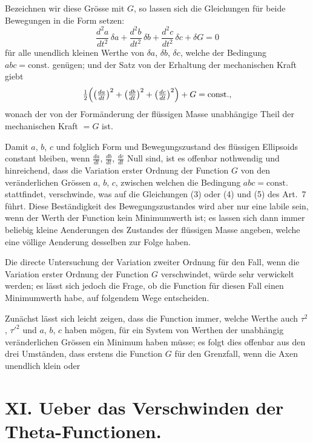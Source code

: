 \documentclass[12pt,a4paper]{book}
\theoremstyle{definition}
\theoremstyle{remark}
\begin{document}
Bezeichnen wir diese Grösse mit $G$, so lassen sich die Gleichungen für beide Bewegungen in die Form setzen:
\begin{equation}
\tag{1} \frac{d^2a}{dt^2}\,\delta a + \frac{d^2b}{dt^2}\,\delta b + \frac{d^2c}{dt^2}\,\delta c + \delta G = 0 \end{equation}
für alle unendlich kleinen Werthe von $\delta a$, $\delta b$, $\delta c$, welche der Bedingung $abc = \text{const.}$ genügen; und der Satz von der Erhaltung der mechanischen Kraft giebt
\[ \tfrac{1}{2}\Bigl(\bigl(\tfrac{da}{dt}\bigr)^2 + \bigl(\tfrac{db}{dt}\bigr)^2 + \bigl(\tfrac{dc}{dt}\bigr)^2\Bigr) + G = \text{const.}, \]
wonach der von der Formänderung der flüssigen Masse unabhängige Theil der mechanischen Kraft $= G$ ist.

Damit $a$, $b$, $c$ und folglich Form und Bewegungszustand des flüssigen Ellipsoids constant bleiben, wenn $\frac{da}{dt}$, $\frac{db}{dt}$, $\frac{dc}{dt}$ Null sind, ist es offenbar nothwendig und hinreichend, dass die Variation erster Ordnung der Function $G$ von den veränderlichen Grössen $a$, $b$, $c$, zwischen welchen die Bedingung $abc = \text{const.}$ stattfindet, verschwinde, was auf die Gleichungen (3) oder (4) und (5) des Art.~7 führt. Diese Beständigkeit des Bewegungszustandes wird aber nur eine labile sein, wenn der Werth der Function kein Minimumwerth ist; es lassen sich dann immer beliebig kleine Aenderungen des Zustandes der flüssigen Masse angeben, welche eine völlige Aenderung desselben zur Folge haben.

Die directe Untersuchung der Variation zweiter Ordnung für den Fall, wenn die Variation erster Ordnung der Function $G$ verschwindet, würde sehr verwickelt werden; es lässt sich jedoch die Frage, ob die Function für diesen Fall einen Minimumwerth habe, auf folgendem Wege entscheiden.

Zunächst lässt sich leicht zeigen, dass die Function immer, welche Werthe auch $\tau^2$, $\tau'^2$ und $a$, $b$, $c$ haben mögen, für ein System von Werthen der unabhängig veränderlichen Grössen ein Minimum haben müsse; es folgt dies offenbar aus den drei Umständen, dass erstens die Function $G$ für den Grenzfall, wenn die Axen unendlich klein oder

\newpage
\section*{XI. Ueber das Verschwinden der Theta-Functionen.}
\end{document}
